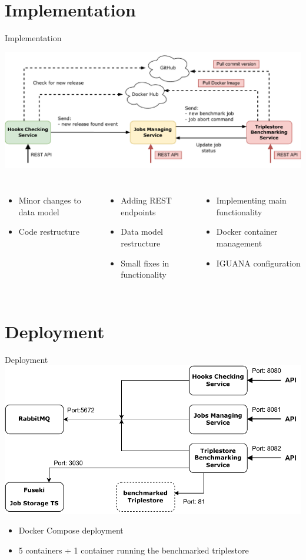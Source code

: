 \section{Implementation}

\begin{frame}{Implementation}
	\centering
	
	\includegraphics[width=1\textwidth]{images/basilisk/high-level-design-approach_colors.pdf}
	
	\begin{columns}[T]
		\begin{itemize}
			\item Minor changes to data model
			\item Code restructure
		\end{itemize}
		
		\begin{itemize}
			\item Adding REST endpoints
			\item Data model restructure
			\item Small fixes in functionality
		\end{itemize}
		
		\begin{itemize}
			\item Implementing main functionality
			\item Docker container management
			\item IGUANA configuration
		\end{itemize}
		
	\end{columns}
	
\end{frame}

\section{Deployment}
\begin{frame}{Deployment}
	\centering
	\includegraphics[width=.7\textwidth]{images/basilisk/docker-setup.pdf}
	
	\begin{itemize}
		\item Docker Compose deployment
		\item 5 containers + 1 container running the benchmarked triplestore
	\end{itemize}
\end{frame}